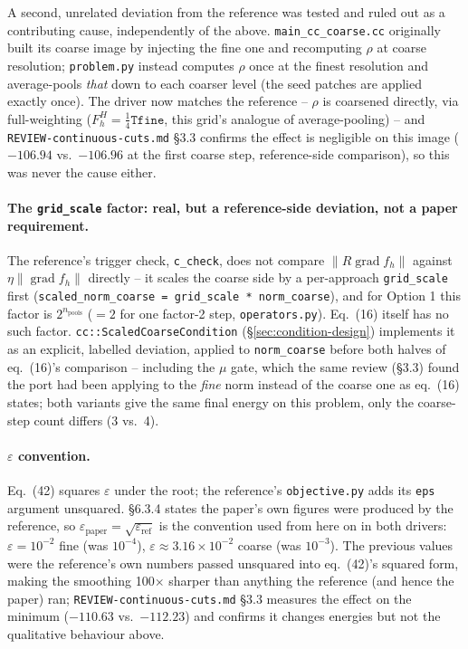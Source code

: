 \documentclass[11pt]{article}
\begin{document}
A second, unrelated deviation from the reference was tested and ruled out as a contributing
cause, independently of the above. \texttt{main\_cc\_coarse.cc} originally built its coarse
image by injecting the fine one and recomputing $\rho$ at coarse resolution;
\texttt{problem.py} instead computes $\rho$ once at the finest resolution and average-pools
\emph{that} down to each coarser level (the seed patches are applied exactly once). The driver
now matches the reference -- $\rho$ is coarsened directly, via full-weighting
($F_h^H=\tfrac14\texttt{Tfine}$, this grid's analogue of average-pooling) -- and
\texttt{REVIEW-continuous-cuts.md} \S3.3 confirms the effect is negligible on this image
($-106.94$ vs.\ $-106.96$ at the first coarse step, reference-side comparison), so this was
never the cause either.

\paragraph{The \texttt{grid\_scale} factor: real, but a reference-side deviation, not a paper
requirement.} The reference's trigger check, \texttt{c\_check}, does not compare
$\|R\operatorname{grad}f_h\|$ against $\eta\|\operatorname{grad}f_h\|$ directly -- it scales
the coarse side by a per-approach \texttt{grid\_scale} first
(\texttt{scaled\_norm\_coarse = grid\_scale * norm\_coarse}), and for Option 1 this factor is
$2^{n_{\text{pools}}}$ ($=2$ for one factor-2 step, \texttt{operators.py}). Eq.~(16) itself has
no such factor. \texttt{cc::ScaledCoarseCondition} (\S\ref{sec:condition-design}) implements it
as an explicit, labelled deviation, applied to \texttt{norm\_coarse} before both halves of
eq.~(16)'s comparison -- including the $\mu$ gate, which the same review (\S3.3) found the
port had been applying to the \emph{fine} norm instead of the coarse one as eq.~(16) states;
both variants give the same final energy on this problem, only the coarse-step count differs
(3 vs.\ 4).

\paragraph{$\varepsilon$ convention.} Eq.~(42) squares $\varepsilon$ under the root; the
reference's \texttt{objective.py} adds its \texttt{eps} argument unsquared. \S6.3.4 states the
paper's own figures were produced by the reference, so $\varepsilon_{\text{paper}} =
\sqrt{\varepsilon_{\text{ref}}}$ is the convention used from here on in both drivers:
$\varepsilon=10^{-2}$ fine (was $10^{-4}$), $\varepsilon\approx3.16\times10^{-2}$ coarse (was
$10^{-3}$). The previous values were the reference's own numbers passed unsquared into eq.~(42)'s
squared form, making the smoothing 100$\times$ sharper than anything the reference (and hence
the paper) ran; \texttt{REVIEW-continuous-cuts.md} \S3.3 measures the effect on the minimum
($-110.63$ vs.\ $-112.23$) and confirms it changes energies but not the qualitative behaviour
above.
\end{document}
